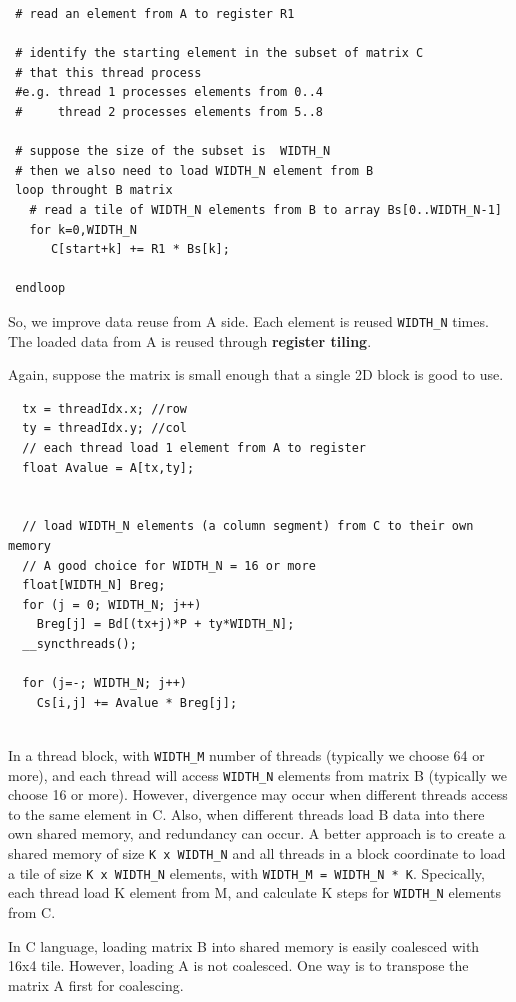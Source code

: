\begin{verbatim}
 # read an element from A to register R1
 
 # identify the starting element in the subset of matrix C
 # that this thread process
 #e.g. thread 1 processes elements from 0..4
 #     thread 2 processes elements from 5..8

 # suppose the size of the subset is  WIDTH_N
 # then we also need to load WIDTH_N element from B
 loop throught B matrix
   # read a tile of WIDTH_N elements from B to array Bs[0..WIDTH_N-1]
   for k=0,WIDTH_N
      C[start+k] += R1 * Bs[k];
       
 endloop
\end{verbatim}
So, we improve data reuse from A side. Each element is reused \verb!WIDTH_N!
times. The loaded data from A is reused through {\bf register tiling}. 

Again, suppose the matrix is small enough that a single 2D block is good to use.
\begin{lstlisting}
  tx = threadIdx.x; //row
  ty = threadIdx.y; //col
  // each thread load 1 element from A to register
  float Avalue = A[tx,ty];
  
  
  // load WIDTH_N elements (a column segment) from C to their own memory
  // A good choice for WIDTH_N = 16 or more
  float[WIDTH_N] Breg; 
  for (j = 0; WIDTH_N; j++)
    Breg[j] = Bd[(tx+j)*P + ty*WIDTH_N];
  __syncthreads();
  
  for (j=-; WIDTH_N; j++)
    Cs[i,j] += Avalue * Breg[j];
    
\end{lstlisting}
In a thread block, with \verb!WIDTH_M! number of threads (typically we choose
64 or more), and each thread will access \verb!WIDTH_N! elements from matrix B
(typically we choose 16 or more). However, divergence may occur when different
threads access to the same element in C. Also, when different threads load B
data into there own shared memory, and redundancy can occur. A better approach
is to create a shared memory of size \verb!K x WIDTH_N! and all threads in a
block coordinate to load a tile of size \verb!K x WIDTH_N! elements, with
\verb!WIDTH_M = WIDTH_N * K!.  Specically, each thread load K element from M,
and calculate K steps for \verb!WIDTH_N! elements from C.


In C language, loading matrix B into shared memory is easily coalesced with 16x4
tile. However, loading A is not coalesced. One way is to transpose the matrix A
first for coalescing. 

